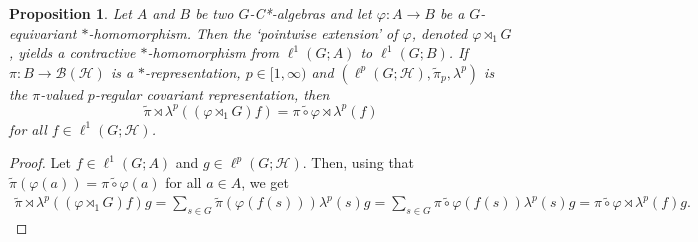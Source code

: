 \documentclass[12pt]{amsart}
\newtheorem{prop}[thm]{Proposition}
\theoremstyle{definition}
\theoremstyle{remark}
\numberwithin{equation}{section}
\begin{document}
\begin{prop}\label{prop:pointwiseext}
	Let $A$ and $B$ be two $G$-C*-algebras and let $\varphi\colon A \to B$ be a
	$G$-equivariant $*$-homo\-mor\-phis\-m. Then the `pointwise extension' of $\varphi$, denoted  $\varphi\rtimes_1 G$, yields  a contractive $*$-homo\-mor\-phism   from $\ell^1(G;A)$ to $\ell^1(G; B)$.
	If $\pi \colon B\to \mathcal{B}(\mathcal{H})$ is a $*$-representation, $p\in [1,\infty)$ and
	$(\ell^p(G;\mathcal{H}),\tilde{\pi}_p,\lambda^p)$ is the $\pi$-valued
	$p$-regular covariant representation, then
	$$\tilde{\pi}\rtimes \lambda^p((\varphi\rtimes_1 G) f) = \widetilde{\pi\circ \varphi}\rtimes \lambda^p
	(f)$$ for all $f\in \ell^1(G;\mathcal{H})$.
\end{prop}
\begin{proof}
	Let $f\in \ell^1(G;A)$ and $g\in \ell^p(G; \mathcal{H})$. Then, using
	that $\tilde{\pi}(\varphi(a)) = \widetilde{\pi\circ \varphi}(a)$ for all
	$a\in A$, we get
	\begin{align*}
 \tilde{\pi}\rtimes \lambda^p((\varphi\rtimes_1 G) f) g
		= \sum_{s\in G} \tilde{\pi}(\varphi(f(s))) \lambda^p(s) g
		= \sum_{s\in G} \widetilde{\pi\circ \varphi}(f(s)) \lambda^p(s) g
		= \widetilde{\pi\circ \varphi} \rtimes \lambda^p(f)  g.
	\end{align*}
\end{proof}
\end{document}
